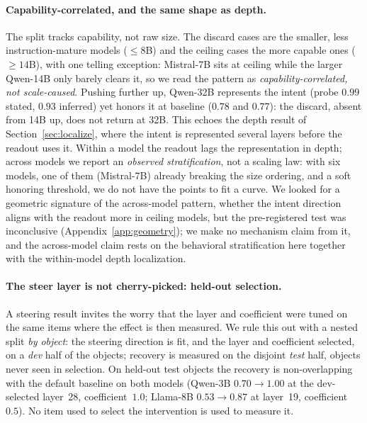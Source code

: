 \documentclass[11pt]{article}
\begin{document}
\paragraph{Capability-correlated, and the same shape as depth.} The split tracks capability, not raw size. The
discard cases are the smaller, less instruction-mature models ($\le 8$B) and the ceiling cases the more capable
ones ($\ge 14$B), with one telling exception: Mistral-7B sits at ceiling while the larger Qwen-14B only barely
clears it, so we read the pattern as \emph{capability-correlated, not scale-caused}. Pushing further up, Qwen-32B
represents the intent (probe $0.99$ stated, $0.93$ inferred) yet honors it at baseline ($0.78$ and $0.77$): the
discard, absent from 14B up, does not return at 32B. This echoes the depth result of Section~\ref{sec:localize}, where the
intent is represented several layers before the readout uses it. Within a model the readout lags the
representation in depth; across models we report an \emph{observed stratification}, not a scaling law: with six
models, one of them (Mistral-7B) already breaking the size ordering, and a soft honoring threshold, we do not
have the points to fit a curve. We looked for a geometric signature of the across-model pattern, whether the
intent direction aligns with the readout more in ceiling models, but the pre-registered test was inconclusive
(Appendix~\ref{app:geometry}); we make no mechanism claim from it, and the across-model claim rests on the
behavioral stratification here together with the within-model depth localization.

\paragraph{The steer layer is not cherry-picked: held-out selection.} A steering result invites the worry that
the layer and coefficient were tuned on the same items where the effect is then measured. We rule this out with
a nested split \emph{by object}: the steering direction is fit, and the layer and coefficient selected, on a
\emph{dev} half of the objects; recovery is measured on the disjoint \emph{test} half, objects never seen in
selection. On held-out test objects the recovery is non-overlapping with the default baseline on both models
(Qwen-3B $0.70 \to 1.00$ at the dev-selected layer~28, coefficient~$1.0$; Llama-8B $0.53 \to 0.87$ at
layer~19, coefficient~$0.5$). No item used to select the intervention is used to measure it.
\end{document}
